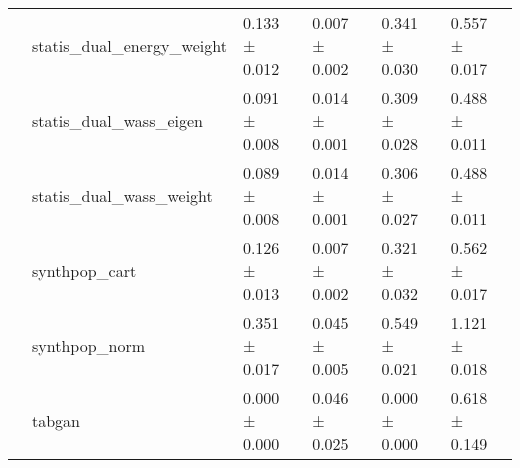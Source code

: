 \begin{tabular}{llllll}
 & statis_dual_energy_weight & 0.133 ± 0.012 & \cellcolor{mygreen}0.007 ± 0.002 & 0.341 ± 0.030 & 0.557 ± 0.017 \\
 & statis_dual_wass_eigen & 0.091 ± 0.008 & 0.014 ± 0.001 & 0.309 ± 0.028 & 0.488 ± 0.011 \\
 & statis_dual_wass_weight & 0.089 ± 0.008 & 0.014 ± 0.001 & 0.306 ± 0.027 & 0.488 ± 0.011 \\
 & synthpop_cart & 0.126 ± 0.013 & \cellcolor{mygreen}0.007 ± 0.002 & 0.321 ± 0.032 & 0.562 ± 0.017 \\
 & synthpop_norm & \cellcolor{myred}0.351 ± 0.017 & 0.045 ± 0.005 & \cellcolor{myred}0.549 ± 0.021 & \cellcolor{myred}1.121 ± 0.018 \\
 & tabgan & \cellcolor{mygreen}0.000 ± 0.000 & \cellcolor{myred}0.046 ± 0.025 & \cellcolor{mygreen}0.000 ± 0.000 & 0.618 ± 0.149 \\
\cline{1-6}
\bottomrule
\end{tabular}
